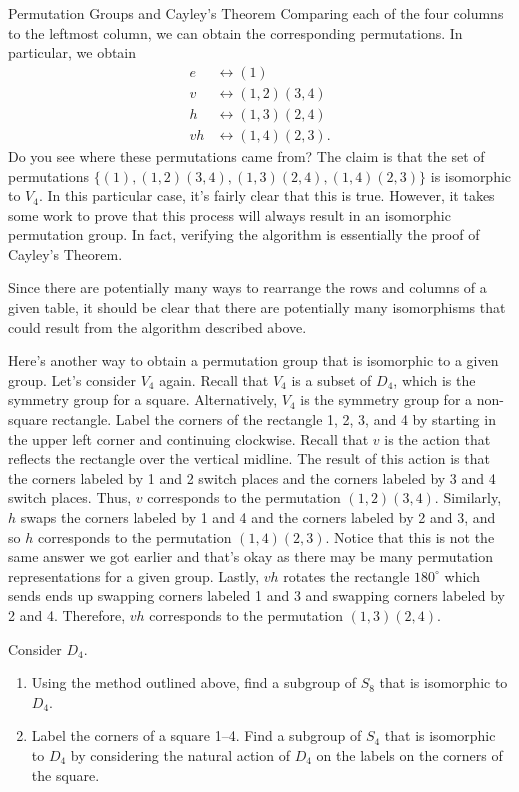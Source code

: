 \begin{section}{Permutation Groups and Cayley's Theorem}
\noindent Comparing each of the four columns to the leftmost column, we can obtain the corresponding permutations.  In particular, we obtain
\begin{align*}
e&\leftrightarrow (1)\\
v&\leftrightarrow (1,2)(3,4)\\
h&\leftrightarrow (1,3)(2,4)\\
vh&\leftrightarrow(1,4)(2,3). 
\end{align*}
Do you see where these permutations came from?  The claim is that the set of permutations $\{(1),(1,2)(3,4),(1,3)(2,4),(1,4)(2,3)\}$ is isomorphic to $V_4$.  In this particular case, it's fairly clear that this is true.  However, it takes some work to prove that this process will always result in an isomorphic permutation group.  In fact, verifying the algorithm is essentially the proof of Cayley's Theorem. 

Since there are potentially many ways to rearrange the rows and columns of a given table, it should be clear that there are potentially many isomorphisms that could result from the algorithm described above.

Here's another way to obtain a permutation group that is isomorphic to a given group.  Let's consider $V_4$ again.  Recall that $V_4$ is a subset of $D_4$, which is the symmetry group for a square.  Alternatively, $V_4$ is the symmetry group for a non-square rectangle.  Label the corners of the rectangle 1, 2, 3, and 4 by starting in the upper left corner and continuing clockwise.  Recall that $v$ is the action that reflects the rectangle over the vertical midline.  The result of this action is that the corners labeled by 1 and 2 switch places and the corners labeled by 3 and 4 switch places.  Thus, $v$ corresponds to the permutation $(1,2)(3,4)$.  Similarly, $h$ swaps the corners labeled by 1 and 4 and the corners labeled by 2 and 3, and so $h$ corresponds to the permutation $(1,4)(2,3)$.  Notice that this is not the same answer we got earlier and that's okay as there may be many permutation representations for a given group.  Lastly, $vh$ rotates the rectangle $180^{\circ}$ which sends ends up swapping corners labeled 1 and 3 and swapping corners labeled by 2 and 4.  Therefore, $vh$ corresponds to the permutation $(1,3)(2,4)$.

\begin{problem}
Consider $D_4$.
\begin{enumerate}[label=\textrm{(\alph*)}]
\item Using the method outlined above, find a subgroup of $S_8$ that is isomorphic to $D_4$.
\item Label the corners of a square 1--4. Find a subgroup of $S_4$ that is isomorphic to $D_4$ by considering the natural action of $D_4$ on the labels on the corners of the square.
\end{enumerate}
\end{problem}


\end{section}
